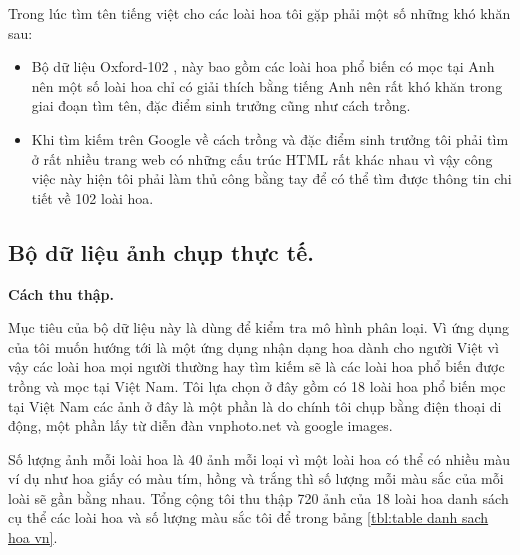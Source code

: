 \documentclass[12pt]{report}
\begin{document}
		Trong lúc tìm tên tiếng việt cho các loài hoa tôi gặp phải một số những khó khăn sau:
		\begin{itemize}
			\item Bộ dữ liệu Oxford-102 \cite{cia-Nilsback06}, này bao gồm các loài hoa phổ biến có mọc tại Anh nên một số loài hoa chỉ có giải thích bằng tiếng Anh nên rất khó khăn trong giai đoạn tìm tên, đặc điểm sinh trưởng cũng như cách trồng.
			\item Khi tìm kiếm trên Google về cách trồng và đặc điểm sinh trưởng tôi phải tìm ở rất nhiều trang web có những cấu trúc HTML rất khác nhau vì vậy công việc này hiện tôi phải làm thủ công bằng tay để có thể tìm được thông tin chi tiết về 102 loài hoa.
		\end{itemize}
								
		\subsection{Bộ dữ liệu ảnh chụp thực tế.}
		\textbf{Cách thu thập.}
								
		Mục tiêu của bộ dữ liệu này là dùng để kiểm tra mô hình phân loại. 
		Vì ứng dụng của tôi muốn hướng tới là một ứng dụng nhận dạng hoa dành 
		cho người Việt vì vậy các loài hoa mọi người thường hay tìm kiếm sẽ là 
		các loài hoa phổ biến được trồng và mọc tại Việt Nam. Tôi lựa chọn ở đây gồm có 18 loài hoa phổ biến mọc tại Việt Nam các ảnh ở đây là một phần là do chính tôi chụp bằng điện thoại di động, một phần lấy từ diễn đàn vnphoto.net và google images. 
		
		Số lượng ảnh mỗi loài hoa là 40 ảnh mỗi loại vì một loài hoa có thể có nhiều màu ví dụ như hoa giấy có màu tím, hồng và trắng thì số lượng mỗi màu sắc của mỗi loài sẽ gần bằng nhau. Tổng cộng tôi thu thập 720 ảnh của 18 loài hoa danh sách cụ thể các loài hoa và số lượng màu sắc tôi để trong 
		bảng \ref{tbl:table danh sach hoa vn}.
								
\end{document}
